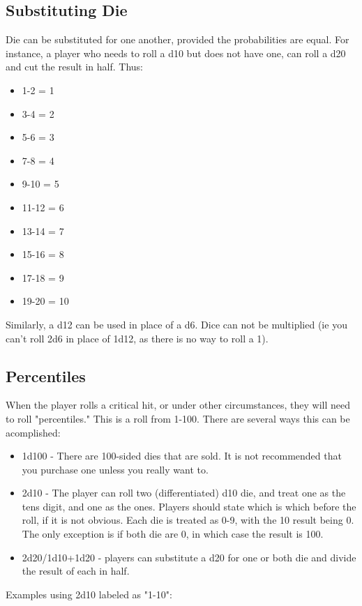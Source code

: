 \subsection{Substituting Die}
Die can be substituted for one another, provided the probabilities are equal. For instance, a player who needs to roll a d10 but does not have one, can roll a d20 and cut the result in half. Thus:
\begin{itemize}
\item 1-2 = 1
\item 3-4 = 2
\item 5-6 = 3
\item 7-8 = 4
\item 9-10 = 5
\item 11-12 = 6
\item 13-14 = 7 
\item 15-16 = 8
\item 17-18 = 9
\item 19-20 = 10
\end{itemize}

Similarly, a d12 can be used in place of a d6. Dice can not be multiplied (ie you can't roll 2d6 in place of 1d12, as there is no way to roll a 1).

\subsection{Percentiles}

When the player rolls a critical hit, or under other circumstances, they will need to roll "percentiles." This is a roll from 1-100. There are several ways this can be acomplished:

\begin{itemize}
\item 1d100 - There are 100-sided dies that are sold. It is not recommended that you purchase one unless you really want to.
\item 2d10 - The player can roll two (differentiated) d10 die, and treat one as the tens digit, and one as the ones. Players should state which is which before the roll, if it is not obvious. Each die is treated as 0-9, with the 10 result being 0. The only exception is if both die are 0, in which case the result is 100.
\item 2d20/1d10+1d20 - players can substitute a d20 for one or both die and divide the result of each in half.
\end{itemize}

Examples using 2d10 labeled as "1-10": 

